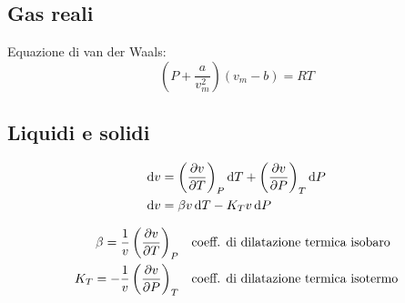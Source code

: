 \subsection{Gas reali}
Equazione di van der Waals:
\[\left(P + \frac{a}{v_m^2}\right)(v_m-b) = RT\]

\subsection{Liquidi e solidi}
\begin{align*}
    \dd{v} &= \left(\pdv{v}{T}\right)_P \dd{T} + \left(\pdv{v}{P}\right)_T \dd{P} \\
    \dd{v} &= \beta v \dd{T} - K_T v \dd{P}
\end{align*}

\begin{align*}
    \beta = \frac{1}{v} \left(\pdv{v}{T}\right)_P & \quad \text{coeff. di dilatazione termica isobaro} \\
    K_T = -\frac{1}{v} \left(\pdv{v}{P}\right)_T & \quad \text{coeff. di dilatazione termica isotermo} \\
\end{align*}
